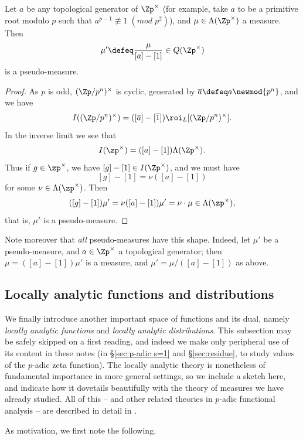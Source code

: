 \documentclass[a4paper,10pt, english, reqno]{smfart}
\numberwithin{equation}{section}
\begin{document}
\begin{lemma}\label{lem:pseudo-measure existence}
	Let $a$ be any topological generator of $\Zp^\times$ (for example, take $a$ to be a primitive root modulo $p$ such that $a^{p - 1} \not\equiv 1 \; (mod \; p^2)$), and $\mu \in \Lambda(\Zp^\times)$ a measure. Then 
	\[
		\mu' \defeq \frac{\mu}{[a]-[1]} \in Q(\Zp^\times)
	\]
	is a pseudo-measure.
\end{lemma}
\begin{proof}
As $p$ is odd, $(\Zp/p^n)^\times$ is cyclic, generated by $\overline{a} \defeq a\newmod{p^n}$, and we have
\[
I((\Zp/p^n)^\times) = ([\overline{a}] - [\overline{1}])\roi_L[(\Zp/p^n)^\times].
\]
In the inverse limit we see that
\[
I(\zp^\times) = ([a]-[1])\Lambda(\Zp^\times).
\]
Thus if $g \in \zp^\times$, we have $[g]-[1] \in I(\Zp^\times)$, and we must have
\[
[g]-[1] = \nu([a]-[1])
\]
for some $\nu \in \Lambda(\zp^\times)$. Then 
\[
([g]-[1])\mu' = \nu([a]-[1])\mu' = \nu \cdot \mu \in \Lambda(\zp^\times),
\]
that is, $\mu'$ is a pseudo-measure.
\end{proof}

Note moreover that \emph{all} pseudo-measures have this shape. Indeed, let $\mu'$ be a pseudo-measure, and $a \in \Zp^\times$ a topological generator; then $\mu = ([a]-[1])\mu'$ is a measure, and $\mu' = \mu/([a]-[1])$ as above.


\subsection{Locally analytic functions and distributions}
\label{sec:locally analytic}

We finally introduce another important space of functions and its dual, namely \emph{locally analytic functions} and \emph{locally analytic distributions}. This subsection may be safely skipped on a first reading, and indeed we make only peripheral use of its content in these notes (in \S\ref{sec:p-adic s=1} and \S\ref{sec:residue}, to study values of the $p$-adic zeta function). The locally analytic theory is nonetheless of fundamental importance in more general settings, so we include a sketch here, and indicate how it dovetails beautifully with the theory of measures we have already studied. All of this -- and other related theories in $p$-adic functional analysis -- are described in detail in \cite{Colm10}.

As motivation, we first note the following.
\end{document}

